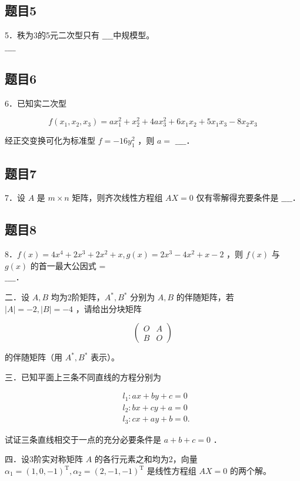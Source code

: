 \documentclass{article}
\begin{document}
\subsection{题目5}
5．秩为3的5元二次型只有 \(\_\_\_\_\)中规模型。\\
\(\_\_\_\_\)

\subsection{题目6}
6．已知实二次型

\[
f\left(x_{1}, x_{2}, x_{3}\right)=a x_{1}^{2}+x_{2}^{2}+4 a x_{3}^{2}+6 x_{1} x_{2}+5 x_{1} x_{3}-8 x_{2} x_{3}
\]

经正交变换可化为标准型 \(f=-16 y_{1}^{2}\) ，则 \(a=\) \(\_\_\_\_\)．

\subsection{题目7}
7．设 \(A\) 是 \(m \times n\) 矩阵，则齐次线性方程组 \(A X=0\) 仅有零解得充要条件是 \(\_\_\_\_\)．

\subsection{题目8}
8．\(f(x)=4 x^{4}+2 x^{3}+2 x^{2}+x, g(x)=2 x^{3}-4 x^{2}+x-2\) ，则 \(f(x)\) 与 \(g(x)\) 的首一最大公因式 =\\
\(\_\_\_\_\)．

二．设 \(A, B\) 均为2阶矩阵，\(A^{*}, B^{*}\) 分别为 \(A, B\) 的伴随矩阵，若 \(|A|=-2,|B|=-4\) ，请给出分块矩阵

\[
\left(\begin{array}{ll}
O & A \\
B & O
\end{array}\right)
\]

的伴随矩阵（用 \(A^{*}, B^{*}\) 表示）。

三．已知平面上三条不同直线的方程分别为

\[
\begin{aligned}
& l_{1}: a x+b y+c=0 \\
& l_{2}: b x+c y+a=0 \\
& l_{3}: c x+a y+b=0 .
\end{aligned}
\]

试证三条直线相交于一点的充分必要条件是 \(a+b+c=0\) ．

四．设3阶实对称矩阵 \(A\) 的各行元素之和均为2，向量 \(\alpha_{1}=(1,0,-1)^{\mathrm{T}}, \alpha_{2}=(2,-1,-1)^{\mathrm{T}}\) 是线性方程组 \(A X=0\) 的两个解。
\end{document}
